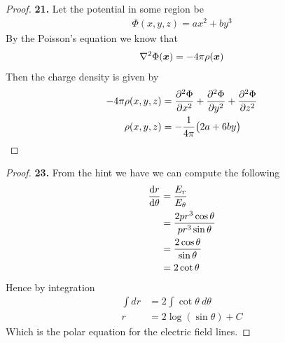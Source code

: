 \documentclass[11pt]{article}
\theoremstyle{definition}
\begin{document}
\cleardoublepage
\begin{proof}{\textbf{21.}}
    Let the potential in some region be
    \begin{align*}
        \Phi(x,y,z) = ax^2 + by^3
    \end{align*}
    By the Poisson's equation we know that
    \begin{align*}
        \laplacian{\Phi(\bm{x})} = -4\pi \rho(\bm{x})
    \end{align*}
    Then the charge density is given by
    \begin{align*}
        -4\pi \rho(x,y,z)
        &= \partialderivative[2]{\Phi}{x} + \partialderivative[2]{\Phi}{y} +
        \partialderivative[2]{\Phi}{z}\\
        \rho(x,y,z)
        &= -\frac{1}{4\pi}\big(2a + 6by\big) 
    \end{align*}
\end{proof}
\cleardoublepage
\begin{proof}{\textbf{23.}}
    From the hint we have we can compute the following
    \begin{align*}
        \derivative{r}{\theta} &= \frac{E_r}{E_\theta}\\
        &= \frac{2pr^3\cos\theta}{pr^3\sin\theta}\\
        &= \frac{2\cos\theta}{\sin\theta}\\
        &= 2\cot\theta
    \end{align*}
    Hence by integration
    \begin{align*}
        \int dr &= 2\int \cot\theta~d\theta\\
        r &= 2\log(\sin\theta) + C
    \end{align*}
    Which is the polar equation for the electric field lines. 
\end{proof}
\cleardoublepage
\end{document}
